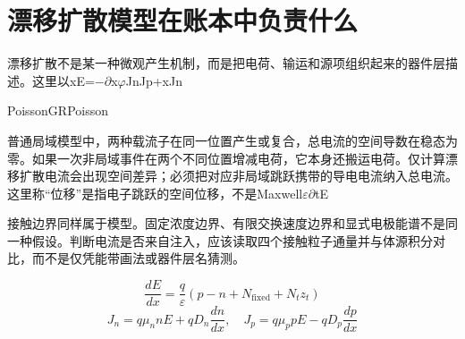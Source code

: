 \section{{\cjkfont 漂移扩散模型在账本中负责什么}\allowbreak{}}\label{sec:10}
{\cjkfont 漂移扩散不是某一种微观产生机制，而是把电荷、输运和源项组织起来的器件层描述。这里以}\allowbreak{}x\allowbreak{}E=\allowbreak{}−\ensuremath{\partial}x\ensuremath{\varphi}\allowbreak{}Jn\allowbreak{}Jp\allowbreak{}+x\allowbreak{}Jn\allowbreak{}
\par
Poisson\allowbreak{}G\allowbreak{}R\allowbreak{}Poisson\allowbreak{}
\par
{\cjkfont 普通局域模型中，两种载流子在同一位置产生或复合，总电流的空间导数在稳态为零。如果一次非局域事件在两个不同位置增减电荷，它本身还搬运电荷。仅计算漂移扩散电流会出现空间差异；必须把对应非局域跳跃携带的导电电流纳入总电流。这里称“位移”是指电子跳跃的空间位移，不是}\allowbreak{}Maxwell\allowbreak{}\ensuremath{\varepsilon}\ensuremath{\partial}tE\allowbreak{}
\par
{\cjkfont 接触边界同样属于模型。固定浓度边界、有限交换速度边界和显式电极能谱不是同一种假设。判断电流是否来自注入，应该读取四个接触粒子通量并与体源积分对比，而不是仅凭能带画法或器件层名猜测。}\allowbreak{}
\par
\begin{equation}
\frac{dE}{dx}=\frac{q}{\varepsilon}(p-n+N_{\mathrm{fixed}}+N_t z_t)
\label{eq:4}\end{equation}
\begin{equation}
J_n=q\mu_n nE+qD_n\frac{dn}{dx},\quad J_p=q\mu_p pE-qD_p\frac{dp}{dx}
\label{eq:5}\end{equation}
